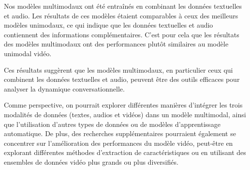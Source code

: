 \documentclass[a4paper]{article}
\begin{document}
Nos modèles multimodaux ont été entraînés en combinant les données textuelles et audio. 
Les résultats de ces modèles étaient comparables à ceux des meilleurs modèles unimodaux, ce qui indique que les données textuelles et audio contiennent des informations complémentaires.
C'est pour cela que les résultats des modèles multimodaux ont des performances plutôt similaires au modèle unimodal vidéo. 

Ces résultats suggèrent que les modèles multimodaux, en particulier ceux qui combinent les données textuelles et audio, peuvent être des outils efficaces pour analyser la dynamique conversationnelle. 

Comme perspective, on pourrait explorer différentes manières d'intégrer les trois modalités de données (textes, audios et vidéos) dans un modèle multimodal, 
ainsi que l'utilisation d'autres types de données ou de modèles d'apprentissage automatique. 
De plus, des recherches supplémentaires pourraient également se concentrer sur l'amélioration des performances du modèle vidéo, 
peut-être en explorant différentes méthodes d'extraction de caractéristiques ou en utilisant des ensembles de données vidéo plus grands ou plus diversifiés.

\bigskip
\printbibliography
\end{document}
